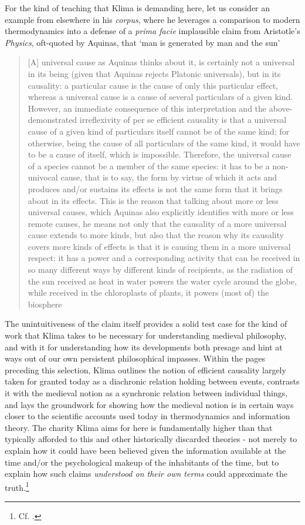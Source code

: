 \documentclass[]{article}
\begin{document}
For the kind of teaching that Klima is demanding here, 
let us consider an example from elsewhere in his \emph{corpus}, 
where he leverages a comparison to modern thermodynamics 
into a defense of a \emph{prima facie} implausible 
claim from Aristotle's \emph{Physics}, 
oft-quoted by Aquinas, 
that `man is generated by man and the sun'
\begin{quote}
	[A] universal
	cause as Aquinas thinks about it, is certainly not a universal in its being
	(given that Aquinas rejects Platonic universals), but in its causality: a
	particular cause is the cause of only this particular effect, whereas a
	universal cause is a cause of several particulars of a given kind. However,
	an immediate consequence of this interpretation and the above-demonstrated irreflexivity of per se efficient causality is that a universal
	cause of a given kind of particulars itself cannot be of the same kind; for
	otherwise, being the cause of all particulars of the same kind, it would
	have to be a cause of itself, which is impossible. Therefore, the universal
	cause of a species cannot be a member of the same species: it has to be a
	non-univocal cause, that is to say, the form by virtue of which it acts and
	produces and/or sustains its effects is not the same form that it brings
	about in its effects. This is the reason that talking about more or less
	universal causes, which Aquinas also explicitly identifies with more or
	less remote causes, he means not only that the causality of a more
	universal cause extends to more kinds, but also that the reason why its
	causality covers more kinds of effects is that it is causing them in a more
	universal respect: it has a power and a corresponding activity that can be
	received in so many different ways by different kinds of recipients, as the
	radiation of the sun received as heat in water powers the water cycle
	around the globe, while received in the chloroplasts of plants, it powers
	(most of) the biosphere \autocite[41]{Klima2013}
\end{quote}
The unintuitiveness of the claim itself provides a solid test case for the kind of work that Klima takes to be necessary for understanding medieval philosophy, 
and with it for understanding how its developments both presage and hint at ways out of our own persistent philosophical impasses. 
Within the pages preceding this selection, 
Klima outlines the notion of efficient causality largely taken for granted today as a diachronic relation holding between events, 
contrasts it with the medieval notion as a synchronic relation between individual things, 
and lays the groundwork for showing how the medieval notion is in certain ways closer to the scientific accounts used today in thermodynamics and information theory. 
The charity Klima aims for here is fundamentally higher than that typically afforded to this and other historically discarded theories - 
not merely to explain 
how it could have been believed given the information available at the time and/or the psychological makeup of the inhabitants of the time, 
but to explain how such claims \emph{understood on their own terms} could approximate the truth.\footnote{Cf. \autocite{Rovelli2015}.} 
\end{document}
